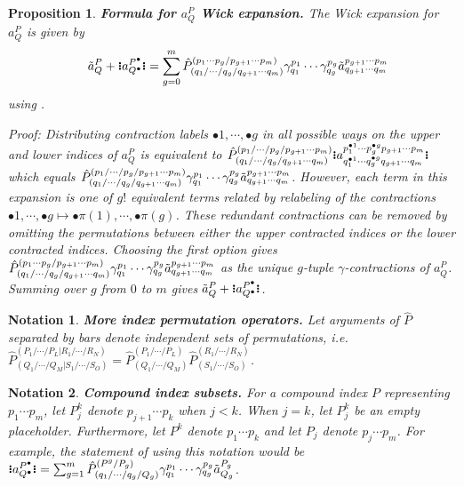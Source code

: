 \documentclass[11pt,fleqn]{article}
\newcommand{\g}{\gamma}      %
\newcommand{\tl}{\ensuremath{\tilde}}
\newcommand{\op}[1]{\ensuremath{\hat{#1}}}
\newcommand{\cd}{\ensuremath{\cdots}}
\newcommand{\bmit}[1]{{\bfseries\itshape\mathversion{bold}#1}}
\newcommand{\GNO}[1]{\setstackgap{S}{0.7pt}\ensuremath{\Shortstack{\textbf{.} \textbf{.} \textbf{.}}#1\Shortstack{\textbf{.} \textbf{.} \textbf{.}}}}
\theoremstyle{mystyle}
\newtheorem{pro}{Proposition}[section]
\newtheorem{ntt}{Notation}[section]
\numberwithin{equation}{section}
\newcommand{\ptcl}{\bullet}
\begin{document}
\begin{pro}
\label{aPQ-contractions-closed-form}
\bmit{Formula for $a_Q^P$ Wick expansion.}
\textit{
The Wick expansion for $a_Q^P$ is given by
\begin{align*}
&&
  \tl{a}_Q^P
+
  \GNO{a_{Q^\ptcl}^{P^\ptcl}}
=
  \sum_{g=0}^{m}
  \op{P}_{(q_1/\cd/q_g/q_{g+1}\cd q_m)}
        ^{(p_1\cd p_g/p_{g+1}\cd p_m)}
  \g_{q_1}^{p_1}\cd\g_{q_g}^{p_g}
  \tl{a}_{q_{g+1}\cd q_m}^{p_{g+1}\cd p_m}
\end{align*}
using .}
\begin{addmargin}[1em]{0em}
Proof:
Distributing contraction labels $\ptcl1,\cd,\ptcl g$ in all possible ways on the upper and lower indices of $a_Q^P$
is equivalent to
$
  \op{P}_{(q_1/\cd/q_g/q_{g+1}\cd q_m)}
        ^{(p_1/\cd/p_g/p_{g+1}\cd p_m)}
  \GNO{a_{q_1^{\ptcl1}\cd q_g^{\ptcl g}q_{g+1}\cd q_m}
        ^{p_1^{\ptcl1}\cd p_g^{\ptcl g}p_{g+1}\cd p_m}}
$
which equals
$
  \op{P}_{(q_1/\cd/q_g/q_{g+1}\cd q_m)}
        ^{(p_1/\cd/p_g/p_{g+1}\cd p_m)}
  \g_{q_1}^{p_1}\cd\g_{q_g}^{p_g}
  \tl{a}_{q_{g+1}\cd q_m}^{p_{g+1}\cd p_m}
$.
However, each term in this expansion is one of $g!$ equivalent terms related by relabeling of the contractions $\ptcl1,\cd,\ptcl g\mapsto\ptcl\pi(1),\cd,\ptcl\pi(g)$.
These redundant contractions can be removed by omitting the permutations between either the upper contracted indices or the lower contracted indices.
Choosing the first option gives
$
  \op{P}_{(q_1/\cd/q_g/q_{g+1}\cd q_m)}
        ^{(p_1\cd p_g/p_{g+1}\cd p_m)}
  \g_{q_1}^{p_1}\cd\g_{q_g}^{p_g}
  \tl{a}_{q_{g+1}\cd q_m}^{p_{g+1}\cd p_m}
$
as the unique $g$-tuple $\g$-contractions of $a_Q^P$.
Summing over $g$ from $0$ to $m$ gives
$
  \tl{a}_Q^P
+
  \GNO{a_{Q^\ptcl}^{P^\ptcl}}
$.
\end{addmargin}
\end{pro}


\begin{ntt}
\label{extended-permutation-ops}
\bmit{More index permutation operators.}
Let arguments of $\op{P}$ separated by bars denote independent sets of permutations, i.e. $\op{P}^{(P_1/\cd/P_L|R_1/\cd/R_N)}_{(Q_1/\cd/Q_M|S_1/\cd/S_O)}=\op{P}^{(P_1/\cd/P_L)}_{(Q_1/\cd/Q_M)}\op{P}^{(R_1/\cd/R_N)}_{(S_1/\cd/S_O)}$.
\end{ntt}

\begin{ntt}
\label{compound-index-subsets}
\bmit{Compound index subsets.}
For a compound index $P$ representing $p_1\cd p_m$, let $P_j^k$ denote $p_{j+1}\cd p_k$ when $j<k$.
When $j=k$, let $P_j^k$ be an empty placeholder.
Furthermore, let $P^k$ denote $p_1\cd p_k$ and let $P_j$ denote $p_j\cd p_m$.
For example, the statement of  using this notation would be
$
  \GNO{a_{Q^\ptcl}^{P^\ptcl}}
=
  \sum_{g=1}^{m}
  \op{P}_{(q_1/\cd/q_g/Q_g)}
        ^{(P^g/P_g)}
  \g_{q_1}^{p_1}\cd\g_{q_g}^{p_g}
  \tl{a}_{Q_g}^{P_g}
$.
\end{ntt}
\end{document}
